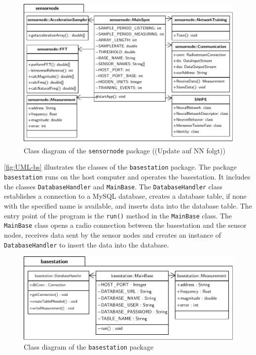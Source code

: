 \documentclass[12pt,a4paper]{scrartcl}
\begin{document}
\begin{figure}[htbp]
    \centering
    \includegraphics[scale=0.83]{figures/uml-sensornode.pdf}
    \caption{Class diagram of the \texttt{sensornode} package ((Update auf NN folgt))}
    \label{fig:UML-sn}
\end{figure}

\autoref{fig:UML-bs} illustrates the classes of the \texttt{base\-station} package.
The package \texttt{base\-station} runs on the host computer and operates the basestation.
It includes the classes \texttt{Database\-Handler} and \texttt{Main\-Base}.
The \texttt{Database\-Handler} class establishes a connection to a MySQL database, creates a database table, if none with the specified name is available, and inserts data into the database table.
The entry point of the program is the \texttt{run()} method in the \texttt{Main\-Base} class. The \texttt{Main\-Base} class opens a radio connection between the basestation and the sensor nodes, receives data sent by the sensor nodes and creates an instance of \texttt{Database\-Handler} to insert the data into the database.

\begin{figure}[htbp]
    \centering
    \includegraphics[scale=0.85]{figures/uml-basestation.pdf}
    \caption{Class diagram of the \texttt{basestation} package}
    \label{fig:UML-bs}
\end{figure}
\end{document}
